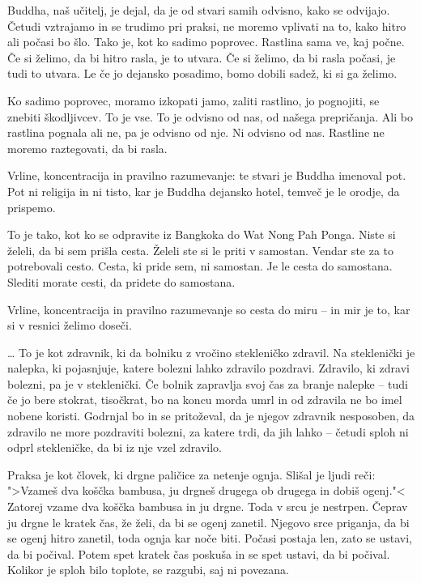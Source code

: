 \vspace{-2\baselineskip}

Buddha, naš učitelj, je dejal, da je od stvari samih odvisno, kako se odvijajo. Četudi vztrajamo in se trudimo pri praksi, ne moremo vplivati na to, kako hitro ali počasi bo šlo. Tako je, kot ko sadimo poprovec. Rastlina sama ve, kaj počne. Če si želimo, da bi hitro rasla, je to utvara. Če si želimo, da bi rasla počasi, je tudi to utvara. Le če jo dejansko posadimo, bomo dobili sadež, ki si ga želimo.

Ko sadimo poprovec, moramo izkopati jamo, zaliti rastlino, jo pognojiti, se znebiti škodljivcev. To je vse. To je odvisno od nas, od našega prepričanja. Ali bo rastlina pognala ali ne, pa je odvisno od nje. Ni odvisno od nas. Rastline ne moremo raztegovati, da bi rasla.

\clearpage


Vrline, koncentracija in pravilno razumevanje: te stvari je Buddha imenoval pot. Pot ni religija in ni tisto, kar je Buddha dejansko hotel, temveč je le orodje, da prispemo.

To je tako, kot ko se odpravite iz Bangkoka do Wat Nong Pah Ponga. Niste si želeli, da bi sem prišla cesta. Želeli ste si le priti v samostan. Vendar ste za to potrebovali cesto. Cesta, ki pride sem, ni samostan. Je le cesta do samostana. Slediti morate cesti, da pridete do samostana.

Vrline, koncentracija in pravilno razumevanje so cesta do miru – in mir je to, kar si v resnici želimo doseči.

\vspace{-\baselineskip}

\ldots{} To je kot zdravnik, ki da bolniku z vročino stekleničko zdravil. Na steklenički je nalepka, ki pojasnjuje, katere bolezni lahko zdravilo pozdravi. Zdravilo, ki zdravi bolezni, pa je v steklenički. Če bolnik zapravlja svoj čas za branje nalepke – tudi če jo bere stokrat, tisočkrat, bo na koncu morda umrl in od zdravila ne bo imel nobene koristi. Godrnjal bo in se pritoževal, da je njegov zdravnik nesposoben, da zdravilo ne more pozdraviti bolezni, za katere trdi, da jih lahko – četudi sploh ni odprl stekleničke, da bi iz nje vzel zdravilo.

\clearpage


Praksa je kot človek, ki drgne paličice za netenje ognja. Slišal je ljudi reči: ">Vzameš dva koščka bambusa, ju drgneš drugega ob drugega in dobiš ogenj."< Zatorej vzame dva koščka bambusa in ju drgne. Toda v srcu je nestrpen. Čeprav ju drgne le kratek čas, že želi, da bi se ogenj zanetil. Njegovo srce priganja, da bi se ogenj hitro zanetil, toda ognja kar noče biti. Počasi postaja len, zato se ustavi, da bi počival. Potem spet kratek čas poskuša in se spet ustavi, da bi počival. Kolikor je sploh bilo toplote, se razgubi, saj ni povezana.

